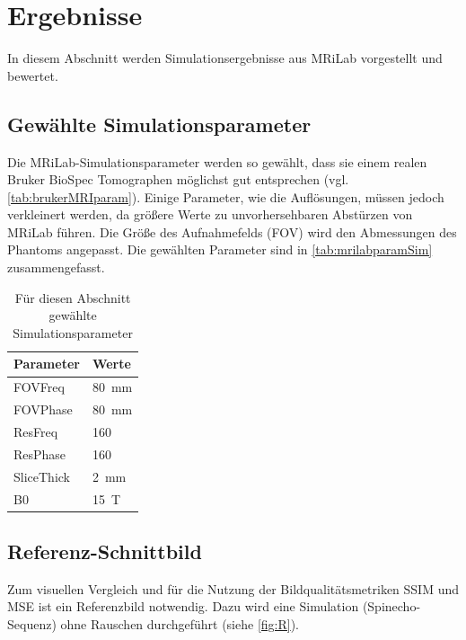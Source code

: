 \chapter{Ergebnisse}
\label{chap:ergb}
In diesem Abschnitt werden Simulationsergebnisse aus MRiLab vorgestellt und bewertet.


\section{Gewählte Simulationsparameter}
Die MRiLab-Simulationsparameter werden so gewählt, dass sie einem realen Bruker BioSpec Tomographen möglichst gut entsprechen (vgl. \autoref{tab:brukerMRIparam}). Einige Parameter, wie die Auflösungen, müssen jedoch verkleinert werden, da größere Werte zu unvorhersehbaren Abstürzen von MRiLab führen. Die Größe des Aufnahmefelds (FOV) wird den Abmessungen des Phantoms angepasst. Die gewählten Parameter sind in \autoref{tab:mrilabparamSim} zusammengefasst.

\begin{table}[H]
	\centering
	\caption[gewählte Simulationsparameter]{Für diesen Abschnitt gewählte Simulationsparameter}
	\label{tab:mrilabparamSim}
	\begin{tabularx}{0.3\textwidth}{lX}
		\toprule
		\textbf{Parameter} & \textbf{Werte}\\
		\midrule
		FOVFreq    & \SI{80}{\mm}\\
		FOVPhase   & \SI{80}{\mm}\\
		ResFreq    & 160\\
		ResPhase   & 160\\
		SliceThick & \SI{2}{\mm}\\
		B0         & \SI{15}{\tesla} \\
		\bottomrule
		\end{tabularx}
\end{table}

\section{Referenz-Schnittbild}
Zum visuellen Vergleich und für die Nutzung der Bildqualitätsmetriken SSIM und MSE ist ein Referenzbild notwendig. Dazu wird eine Simulation (Spinecho-Sequenz) ohne Rauschen durchgeführt (siehe \autoref{fig:R}).

